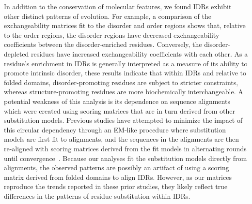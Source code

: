 In addition to the conservation of molecular features, we found IDRs exhibit other distinct patterns of evolution. For example, a comparison of the exchangeability matrices fit to the disorder and order regions shows that, relative to the order regions, the disorder regions have decreased exchangeability coefficients between the disorder-enriched residues. Conversely, the disorder-depleted residues have increased exchangeability coefficients with each other. As a residue's enrichment in IDRs is generally interpreted as a measure of its ability to promote intrinsic disorder, these results indicate that within IDRs and relative to folded domains, disorder-promoting residues are subject to stricter constraints, whereas structure-promoting residues are more biochemically interchangeable. A potential weakness of this analysis is its dependence on sequence alignments which were created using scoring matrices that are in turn derived from other substitution models. Previous studies have attempted to minimize the impact of this circular dependency through an EM-like procedure where substitution models are first fit to alignments, and the sequences in the alignments are then re-aligned with scoring matrices derived from the fit models in alternating rounds until convergence~\cite{Brown2009, Szalkowski2011}. Because our analyses fit the substitution models directly from alignments, the observed patterns are possibly an artifact of using a scoring matrix derived from folded domains to align IDRs. However, as our matrices reproduce the trends reported in these prior studies, they likely reflect true differences in the patterns of residue substitution within IDRs.

